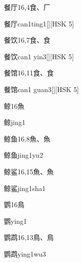 \begin{entry}{餐厅}{16,4}{⾷、⼚}
  \begin{phonetics}{餐厅}{can1ting1}[][HSK 5]
  \end{phonetics}
\end{entry}

\begin{entry}{餐饮}{16,7}{⾷、⾷}
  \begin{phonetics}{餐饮}{can1 yin3}[][HSK 5]
  \end{phonetics}
\end{entry}

\begin{entry}{餐馆}{16,11}{⾷、⾷}
  \begin{phonetics}{餐馆}{can1 guan3}[][HSK 5]
  \end{phonetics}
\end{entry}

\begin{entry}{鲸}{16}{⿂}
  \begin{phonetics}{鲸}{jing1}
  \end{phonetics}
\end{entry}

\begin{entry}{鲸鱼}{16,8}{⿂、⿂}
  \begin{phonetics}{鲸鱼}{jing1yu2}
  \end{phonetics}
\end{entry}

\begin{entry}{鲸鲨}{16,15}{⿂、⿂}
  \begin{phonetics}{鲸鲨}{jing1sha1}
  \end{phonetics}
\end{entry}

\begin{entry}{鹦}{16}{⿃}
  \begin{phonetics}{鹦}{ying1}
  \end{phonetics}
\end{entry}

\begin{entry}{鹦鹉}{16,13}{⿃、⿃}
  \begin{phonetics}{鹦鹉}{ying1wu3}
  \end{phonetics}
\end{entry}

